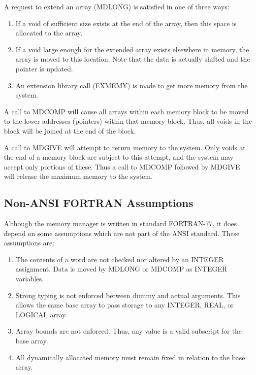 A request to extend an array (MDLONG) is satisfied in one of three ways:
\begin{enumerate}
\item If a void of sufficient size exists at the end of the array, then
          this space is allocated to the array.

\item If a void large enough for the extended array exists elsewhere in
          memory, the array is moved to this location.  Note that the data
          is actually shifted and the pointer is updated.

\item An extension library call (EXMEMY) is made to get more memory from
          the system.
\end{enumerate}

A call to MDCOMP will cause all arrays within each memory block to be moved
to the lower addresses (pointers) within that memory block.  Thus, all voids
in the block will be joined at the end of the block.

A call to MDGIVE will attempt to return memory to the system.  Only voids at
the end of a memory block are subject to this attempt, and the system may
accept only portions of these.  Thus a call to MDCOMP followed by MDGIVE
will release the maximum memory to the system.


\subsection{Non-ANSI FORTRAN Assumptions}
Although the memory manager is written in standard FORTRAN-77, it does
depend on some assumptions which are not part of the ANSI standard.  These
assumptions are:
\begin{enumerate}
\item The contents of a word are not checked nor altered by an INTEGER
          assignment.  Data is moved by MDLONG or MDCOMP as INTEGER
          variables.

\item Strong typing is not enforced between dummy and actual arguments.
          This allows the same base array to pass storage to any INTEGER,
          REAL, or LOGICAL array.

\item Array bounds are not enforced.  Thus, any value is a valid
          subscript for the base array.

\item All dynamically allocated memory must remain fixed in relation to
          the base array.
\end{enumerate}

